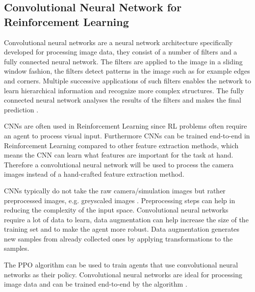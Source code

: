 \subsection*{Convolutional Neural Network for Reinforcement Learning}

Convolutional neural networks are a neural network architecture specifically developed for processing image data, they consist of a number of filters and a fully connected neural network. The filters are applied to the image in a sliding window fashion, the filters detect patterns in the image such as for example edges and corners. Multiple successive applications of such filters enables the network to learn hierarchical information and recognize more complex structures. The fully connected neural network analyses the results of the filters and makes the final prediction \autocite{rlbook2020}.

CNNs are often used in Reinforcement Learning since RL problems often require an agent to process visual input. Furthermore CNNs can be trained end-to-end in Reinforcement Learning compared to other feature extraction methods, which means the CNN can learn what features are important for the task at hand.
Therefore a convolutional neural network will be used to process the camera images instead of a hand-crafted feature extraction method. 

CNNs typically do not take the raw camera/simulation images but rather preprocessed images, e.g. greyscaled images \autocite{atari}. Preprocessing steps can help in reducing the complexity of the input space. Convolutional neural networks require a lot of data to learn, data augmentation can help increase the size of the training set and to make the agent more robust. Data augmentation generates new samples from already collected ones by applying transformations to the samples. 


The PPO algorithm can be used to train agents that use convolutional neural networks as their policy. Convolutional neural networks are ideal for processing image data and can be trained end-to-end by the algorithm \autocite{ppo}. 









